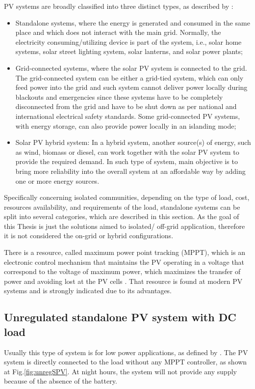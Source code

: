 PV systems are broadly classified into three distinct types, as described by \cite{Mohanty}: 

\begin{itemize}
\item Standalone systems, where the energy is generated and consumed in the same place and which does not interact with the main grid. Normally, the electricity consuming/utilizing device is part of the system, i.e., solar home systems, solar street lighting system, solar lanterns, and solar power plants; 
\item Grid-connected systems, where the solar PV system is connected to the grid. The grid-connected system can be either a grid-tied system, which can only feed power into the grid and such system cannot deliver power locally during blackouts and emergencies since these systems have to be completely disconnected from the grid and have to be shut down as per national and international electrical safety standards. Some grid-connected PV systems, with energy storage, can also provide power locally in an islanding mode; 
\item Solar PV hybrid system: In a hybrid system, another source(s) of energy, such as wind, biomass or diesel, can work together with the solar PV system to provide the required demand. In such type of system, main objective is to bring more reliability into the overall system at an affordable way by adding one or more energy sources.
\end{itemize}
 
Specifically concerning isolated communities, depending on the type of load, cost, resources availability, and requirements of the load, standalone systems can be split into several categories, which are described in this section. As the goal of this Thesis is just the solutions aimed to isolated/ off-grid application, therefore it is not considered the on-grid or hybrid configurations.
 
There is a resource, called maximum power point tracking (MPPT), which is an electronic control mechanism that maintains the PV operating in a voltage that correspond to the voltage of maximum power, which maximizes the transfer of power and avoiding lost at the PV cells \cite{Pinho}. That resource is found at modern PV systems and is strongly indicated due to its advantages.

\subsection{Unregulated standalone PV system with DC load }
Usually this type of system is for low power applications, as defined by \cite{Roy}. The PV system is directly connected to the load without any MPPT controller, as shown at Fig.\ref{fig:unregSPV}. At night hours, the system will not provide any supply because of the absence of the battery. 
 

